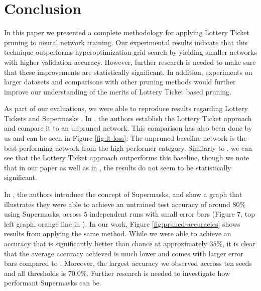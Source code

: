 \documentclass[12pt,final,twoside]{article}
\theoremstyle{plain}
\theoremstyle{definition}
\theoremstyle{remark}
\theoremstyle{named}
\begin{document}
\section{Conclusion}

In this paper we presented a complete methodology for applying Lottery Ticket pruning to neural network training. Our experimental results indicate that this technique outperforms hyperoptimization grid search by yielding smaller networks with higher validation accuracy. However, further research is needed to make sure that these improvements are statistically significant. In addition, experiments on larger datasets and comparisons with other pruning methods would further improve our understanding of the merits of Lottery Ticket based pruning.

As part of our evaluations, we were able to reproduce results regarding Lottery Tickets \cite{lottery} and Supermasks \cite{supermask}. In \cite{lottery}, the authors establish the Lottery Ticket approach and compare it to an unpruned network. This comparison has also been done by us and can be seen in Figure \ref{fig:lt-loss}: The unpruned baseline network is the best-performing network from the high performer category. Similarly to \cite{lottery}, we can see that the Lottery Ticket approach outperforms this baseline, though we note that in our paper as well as in \cite{lottery}, the results do not seem to be statistically significant.

In \cite{supermask}, the authors introduce the concept of Supermasks, and show a graph that illustrates they were able to achieve an untrained test accuracy of around $80\%$ using Supermasks, across $5$ independent runs with small error bars (Figure $7$, top left graph, orange line in \cite{supermask}). In our work, Figure \ref{fig:pruned-accuracies} shows results from applying the same method. While we were able to achieve an accuracy that is significantly better than chance at approximately $35 \%$, it is clear that the average accuracy achieved is much lower and comes with larger error bars compared to \cite{supermask}. Moreover, the largest accuracy we observed accross ten seeds and all thresholds is $70.0\%$. Further research is needed to investigate how performant Supermasks can be.


\end{document}
